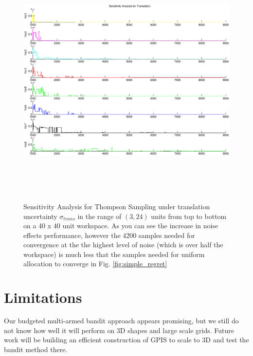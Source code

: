 \documentclass[journal,transmag]{IEEEtran}%
\begin{document}
\begin{figure}[ht!]
\centering
\includegraphics[width = 16.5cm, height = 13cm]{matlab_figures/sensitivity_trans.eps}
\caption{ \footnotesize Sensitivity Analysis for Thompson Sampling under translation uncertainty $\sigma_{trans}$ in the range of $(3,24)$ units from top to bottom on a 40 x 40 unit workspace.  As you can see the increase in noise effects performance, however the 4200 samples needed for convergence at the the highest level of noise (which is over half the workspace) is much less that the samples needed for uniform allocation to converge in Fig. \ref{fig:simple_regret}}
\vspace*{-10pt}
\label{fig:trans_sens}
\end{figure}






\section{Limitations} 

Our budgeted multi-armed bandit approach appears promising, but we still do not know how well it will perform on 3D shapes and large scale grids. Future work will be building an efficient construction of GPIS to scale to 3D and test the bandit method there. 
\end{document}
